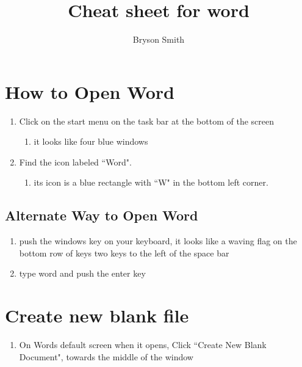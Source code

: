 \documentclass[12pt,letterpaper]{article}
\title{Cheat sheet for word}
\author{Bryson Smith}
\begin{document}
\section{How to Open Word}

\begin{enumerate}
\item Click on the start menu on the task bar at the bottom of the screen
	\begin{enumerate}
	    \item it looks like four blue windows
	\end{enumerate}
\item Find the icon labeled ``Word".
	\begin{enumerate}
	    \item its icon is a blue rectangle with ``W" in the bottom left corner.
	\end{enumerate}
\end{enumerate}
\subsection{Alternate Way to Open Word}
\begin{enumerate}
    \item push the windows key on your keyboard, it looks like a waving flag on the bottom row of keys two keys to the left of the space bar
    \item type word and push the enter key
\end{enumerate}
\section{Create new blank file}
\begin{enumerate}
    \item On Words default screen when it opens, Click ``Create New Blank Document", towards the middle of the window
\end{enumerate}
\end{document}
